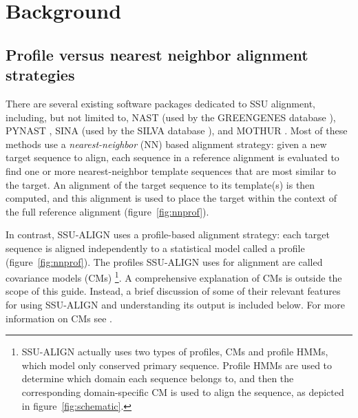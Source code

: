 \section{Background}
\label{sec:background}


\subsection{Profile versus nearest neighbor alignment strategies}

There are several existing software packages dedicated to
SSU alignment, including, but not limited to, NAST
\cite{DeSantis06} (used by the GREENGENES database
\cite{DeSantis06a}), PYNAST \cite{Caporaso10},
SINA (used by the SILVA database
\cite{Pruesse07}), and MOTHUR \cite{Schloss09}.
Most of these methods use a \emph{nearest-neighbor}
(NN) based alignment strategy: given a new target sequence to align,
each sequence in a reference alignment is evaluated to find one or
more nearest-neighbor template sequences that are most similar to the
target. An alignment of the target sequence to its template(s) is then
computed, and this alignment is used to place the target within the
context of the full reference alignment (figure~\ref{fig:nnprof}).

In contrast, SSU-ALIGN uses a profile-based alignment
strategy: each target sequence is aligned independently to a
statistical model called a profile
(figure~\ref{fig:nnprof}). The profiles SSU-ALIGN uses for
alignment are called covariance models (CMs)
\footnote{SSU-ALIGN actually uses two types of profiles,
  CMs and profile HMMs, which model only conserved primary
  sequence. Profile HMMs are used to determine which domain each
  sequence belongs to, and then the corresponding domain-specific CM
  is used to align the sequence, as depicted in
  figure~\ref{fig:schematic}.}.
A comprehensive explanation of CMs is outside the scope of this
guide. Instead, a brief discussion of some of their relevant features
for using SSU-ALIGN and understanding its output is included
below. For more information on CMs see
\cite{Eddy94,Durbin98,Eddy02b,NawrockiEddy07,Nawrocki09,Nawrocki09b,KolbeEddy09}.


